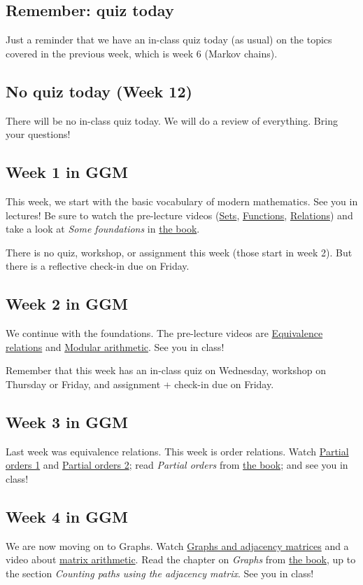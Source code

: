 \documentclass{amsart}
\begin{document}
\subsection{Remember: quiz today}
\label{sec:orgdbc55e7}
Just a reminder that we have an in-class quiz today (as usual) on the topics covered in the previous week, which is week 6 (Markov chains).
\subsection{No quiz today (Week 12)}
\label{sec:org3d5172b}
There will be no in-class quiz today.  We will do a review of everything.  Bring your questions!
\subsection{Week 1 in GGM}
\label{sec:org179e1b8}
This week, we start with the basic vocabulary of modern mathematics.  See you in lectures! Be sure to watch the pre-lecture videos (\href{https://canvas.anu.edu.au/files/704425}{Sets}, \href{https://canvas.anu.edu.au/files/704426}{Functions}, \href{https://canvas.anu.edu.au/files/704427}{Relations}) and take a look at \emph{Some foundations} in \href{https://canvas.anu.edu.au/files/715877/}{the book}.

There is no quiz, workshop, or assignment this week (those start in week 2).  But there is a reflective check-in due on Friday.
\subsection{Week 2 in GGM}
\label{sec:org2d27ed9}
We continue with the foundations.  The pre-lecture videos are  \href{https://canvas.anu.edu.au/files/706765}{Equivalence relations} and \href{https://canvas.anu.edu.au/files/706767}{Modular arithmetic}.  See you in class!

Remember that this week has an in-class quiz on Wednesday, workshop on Thursday or Friday, and assignment + check-in due on Friday.
\subsection{Week 3 in GGM}
\label{sec:org8fc6390}
Last week was equivalence relations.  This week is order relations. Watch \href{https://canvas.anu.edu.au/files/713939/}{Partial orders 1} and \href{https://canvas.anu.edu.au/files/713941/}{Partial orders 2}; read \emph{Partial orders} from \href{https://canvas.anu.edu.au/files/715877/}{the book}; and see you in class!
\subsection{Week 4 in GGM}
\label{sec:org5b38a68}
We are now moving on to Graphs.  Watch \href{https://canvas.anu.edu.au/files/725257/}{Graphs and adjacency matrices} and a video about \href{https://canvas.anu.edu.au/files/725259/}{matrix arithmetic}.  Read the chapter on \emph{Graphs} from \href{https://canvas.anu.edu.au/files/715877/}{the book,} up to the section \emph{Counting paths using the adjacency matrix}.  See you in class!
\end{document}
